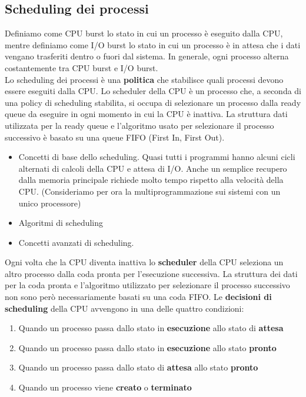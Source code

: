 \documentclass{article}
\begin{document}
\subsection{Scheduling dei processi}
Definiamo come CPU burst lo stato in cui un processo è eseguito dalla CPU, mentre definiamo come I/O burst lo stato in cui un processo è in attesa che i dati vengano trasferiti dentro o fuori dal sistema.
In generale, ogni processo alterna costantemente tra CPU burst e I/O burst.\\
Lo scheduling dei processi è una \textbf{politica} che stabilisce quali processi devono essere eseguiti dalla CPU. Lo scheduler della CPU è un processo che, a seconda di una policy di scheduling stabilita, si occupa di selezionare un processo dalla ready queue da eseguire in ogni momento in cui la CPU è inattiva.
La struttura dati utilizzata per la ready queue e l'algoritmo usato per selezionare il processo successivo è basato su una queue FIFO (First In, First Out).

\begin{itemize}
    \item Concetti di base dello scheduling. Quasi tutti i programmi hanno alcuni cicli alternati di calcoli della CPU e attesa di I/O. Anche un semplice recupero dalla memoria principale richiede molto tempo rispetto alla velocità della CPU. (Consideriamo per ora la multiprogrammazione sui sistemi con un unico processore)
    \item Algoritmi di scheduling
    \item Concetti avanzati di scheduling.
\end{itemize} 

Ogni volta che la CPU diventa inattiva lo \textbf{scheduler} della CPU seleziona un altro processo dalla coda pronta per l'esecuzione successiva. La struttura dei dati per la coda pronta e l'algoritmo utilizzato per selezionare il processo successivo non sono però necessariamente basati su una coda FIFO. Le \textbf{decisioni di scheduling} della CPU avvengono in una delle quattro condizioni:
\begin{enumerate}
    \item Quando un processo passa dallo stato in \textbf{esecuzione} allo stato di \textbf{attesa}
    \item Quando un processo passa dallo stato in \textbf{esecuzione} allo stato \textbf{pronto}
    \item Quando un processo passa dallo stato di \textbf{attesa} allo stato \textbf{pronto}
    \item Quando un processo viene \textbf{creato} o \textbf{terminato}
\end{enumerate}
\end{document}
